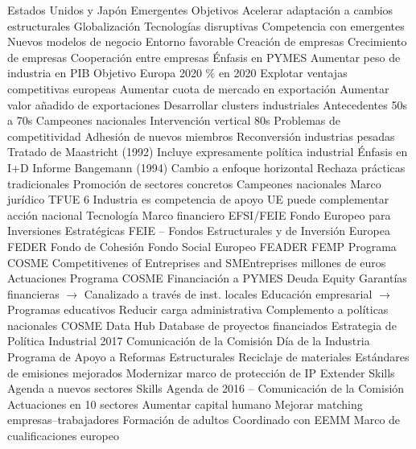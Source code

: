 \documentclass{nuevotema}
\begin{document}
\begin{esquemal}
				\4 Estados Unidos y Japón
				\4 Emergentes
		\2 Objetivos
			\3 Acelerar adaptación a cambios estructurales
				\4 Globalización
				\4 Tecnologías disruptivas
				\4 Competencia con emergentes
				\4 Nuevos modelos de negocio
			\3 Entorno favorable
				\4 Creación de empresas
				\4 Crecimiento de empresas
				\4 Cooperación entre empresas
				\4 Énfasis en PYMES
			\3 Aumentar peso de industria en PIB
				\4 Objetivo Europa 2020
				\% en 2020
			\3 Explotar ventajas competitivas europeas
				\4 Aumentar cuota de mercado en exportación
				\4 Aumentar valor añadido de exportaciones
				\4 Desarrollar clusters industriales
		\2 Antecedentes
			\3 50s a 70s
				\4 Campeones nacionales
				\4 Intervención vertical
			\3 80s
				\4 Problemas de competitividad
				\4 Adhesión de nuevos miembros
				\4 Reconversión industrias pesadas
			\3 Tratado de Maastricht (1992)
				\4 Incluye expresamente política industrial
				\4 Énfasis en I+D
			\3 Informe Bangemann (1994)
				\4 Cambio a enfoque horizontal
				\4 Rechaza prácticas tradicionales
				\4[] Promoción de sectores concretos
				\4[] Campeones nacionales
		\2 Marco jurídico
			\3 TFUE 6
				\4 Industria es competencia de apoyo
				\4[] UE puede complementar acción nacional
				\4 Tecnología
		\2 Marco financiero
			\3 EFSI/FEIE
				\4 Fondo Europeo para Inversiones Estratégicas
			\3 FEIE -- Fondos Estructurales y de Inversión Europea
				\4 FEDER
				\4 Fondo de Cohesión
				\4 Fondo Social Europeo
				\4 FEADER
				\4 FEMP
			\3 Programa COSME
				\4 Competitivenes of Entreprises and SMEntreprises
				 millones de euros
		\2 Actuaciones
			\3 Programa COSME
				\4[] Financiación a PYMES
				\4[] Deuda
				\4[] Equity
				\4[] Garantías financieras
				\4[] $\to$ Canalizado a través de inst. locales
				\4[] Educación empresarial
				\4[] $\to$ Programas educativos
				\4 Reducir carga administrativa
				\4 Complemento a políticas nacionales
				\4 COSME Data Hub
				\4[] Database de proyectos financiados
			\3 Estrategia de Política Industrial 2017
				\4 Comunicación de la Comisión
				\4 Día de la Industria
				\4 Programa de Apoyo a Reformas Estructurales
				\4 Reciclaje de materiales
				\4 Estándares de emisiones mejorados
				\4 Modernizar marco de protección de IP
				\4 Extender Skills Agenda a nuevos sectores
			\3 Skills Agenda de 2016 -- Comunicación de la Comisión
				\4 Actuaciones en 10 sectores
				\4[] Aumentar capital humano
				\4[] Mejorar matching empresas--trabajadores
				\4 Formación de adultos
				\4[] Coordinado con EEMM
				\4 Marco de cualificaciones europeo

\end{esquemal}
\end{document}
